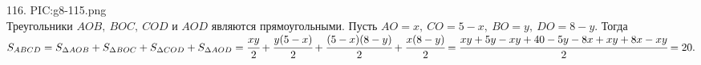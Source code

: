 116. {{PIC:g8-115.png}}\\
Треугольники $AOB,\ BOC,\ COD$ и $AOD$ являются прямоугольными. Пусть $AO=x,\ CO=5-x,\ BO=y,\ DO=8-y.$ Тогда $S_{ABCD}=S_{\Delta AOB}+S_{\Delta BOC}+S_{\Delta COD}+S_{\Delta AOD}=\cfrac{xy}{2}+\cfrac{y(5-x)}{2}+\cfrac{(5-x)(8-y)}{2}+\cfrac{x(8-y)}{2}=\cfrac{xy+5y-xy+40-5y-8x+xy+8x-xy}{2}=20.$\newpage\noindent
